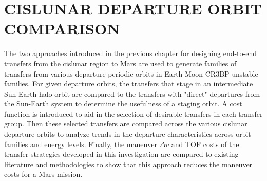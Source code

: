 \chapter{CISLUNAR DEPARTURE ORBIT COMPARISON}

The two approaches introduced in the previous chapter for designing end-to-end transfers from the
cislunar region to Mars are used to generate families of transfers from various departure periodic
orbits in Earth-Moon CR3BP unstable families. For given departure orbits, the transfers that stage
in an intermediate Sun-Earth halo orbit are compared to the transfers with "direct" departures from
the Sun-Earth system to determine the usefulness of a staging orbit. A cost function is introduced
to aid in the selection of desirable transfers in each transfer group. Then these selected
transfers are compared across the various cislunar departure orbits to analyze trends in the
departure characteristics across orbit families and energy levels. Finally, the maneuver $\Delta v$
and TOF costs of the transfer strategies developed in this investigation are compared to existing
literature and methodologies to show that this approach reduces the maneuver costs for a Mars
mission.




